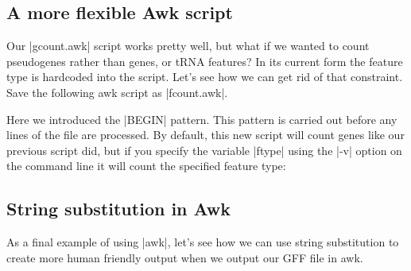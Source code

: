 \subsection{A more flexible Awk script}

Our |gcount.awk| script works pretty well, but what if we wanted to count pseudogenes rather than genes, or tRNA features? In its current form the feature type is hardcoded into the script. Let's see how we can get rid of that constraint. Save the following awk script as |fcount.awk|.
%

Here we introduced the |BEGIN| pattern. This pattern is carried out before any lines of the file are processed.  By default, this new script will count genes like our previous script did, but if you specify the variable |ftype| using the |-v| option on the command line it will count the specified feature type:
%

\subsection{String substitution in Awk}

As a final example of using |awk|, let's see how we can use string substitution to create more human friendly output when we output our GFF file in awk.   

